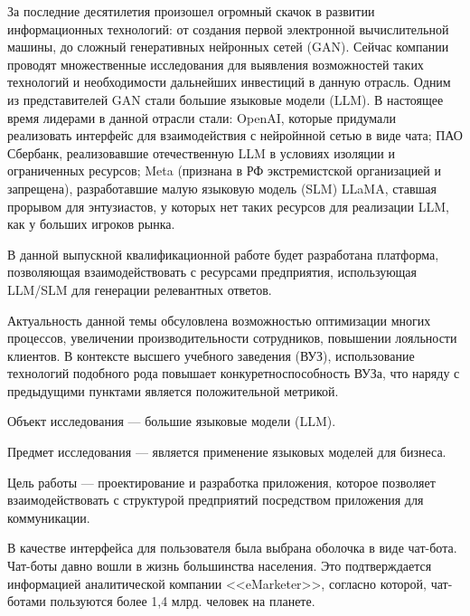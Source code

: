 







За последние десятилетия произошел огромный скачок в развитии информационных технологий:
от создания первой электронной вычислительной машины, до сложный генеративных
нейронных сетей (GAN). Сейчас компании проводят множественные исследования
для выявления возможностей таких технологий и необходимости дальнейших
инвестиций в данную отрасль. Одним из представителей GAN стали большие языковые
модели (LLM). В настоящее время лидерами в данной отрасли стали: OpenAI,
которые придумали реализовать интерфейс для взаимодействия с нейройнной сетью 
в виде чата; ПАО Сбербанк, реализовавшие отечественную LLM в условиях изоляции
и ограниченных ресурсов; Meta (признана в РФ экстремистской организацией и 
запрещена), разработавшие малую языковую модель (SLM) LLaMA, ставшая прорывом 
для энтузиастов, у которых нет таких ресурсов для реализации LLM, как у 
больших игроков рынка.

В данной выпускной квалификационной работе 
будет разработана платформа, позволяющая взаимодействовать с ресурсами предприятия,
использующая LLM/SLM для генерации релевантных ответов.

Актуальность данной темы обсуловлена возможностью оптимизации многих процессов, 
увеличении производительности сотрудников, повышении лояльности клиентов.
В контексте высшего учебного заведения (ВУЗ), использование технологий подобного рода
повышает конкуретноспособность ВУЗа, что наряду с предыдущими пунктами является
положительной метрикой.

Объект исследования --- большие языковые модели (LLM).

Предмет исследования --- является применение языковых моделей для бизнеса.

Цель работы --- проектирование и разработка приложения, которое позволяет
взаимодействовать с структурой предприятий посредством приложения для 
коммуникации.

В качестве интерфейса для пользователя была выбрана оболочка в виде чат-бота.
Чат-боты давно вошли в жизнь большинства населения. Это подтверждается 
информацией аналитической компании <<eMarketer>>, согласно которой, чат-ботами
пользуются более 1,4 млрд. человек на планете.

